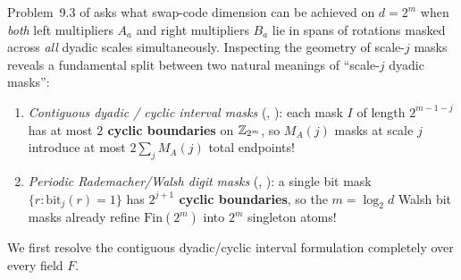 Problem~9.3 of \cite{SeventeenthPaper2026} asks what swap-code dimension can be achieved on
$d = 2^m$ when \emph{both} left multipliers $A_a$ and right multipliers $B_a$ lie in spans of
rotations masked across \emph{all} dyadic scales simultaneously. Inspecting the geometry of
scale-$j$ masks reveals a fundamental split between two natural meanings of ``scale-$j$ dyadic
masks'':
\begin{enumerate}[label=(\roman*)]
\item \emph{Contiguous dyadic / cyclic interval masks} (,
  ): each mask $I$ of length $2^{m-1-j}$ has at most \textbf{$2$ cyclic
  boundaries} on $\mathbb{Z}_{2^m}$, so $M_A(j)$ masks at scale $j$ introduce at most $2\sum_j M_A(j)$
  total endpoints!
\item \emph{Periodic Rademacher/Walsh digit masks} (,
  ): a single bit mask $\{r : \text{bit}_j(r) = 1\}$ has
  \textbf{$2^{j+1}$ cyclic boundaries}, so the $m = \log_2 d$ Walsh bit masks already refine
  $\mathrm{Fin}(2^m)$ into $2^m$ singleton atoms!
\end{enumerate}

We first resolve the contiguous dyadic/cyclic interval formulation completely over every field $F$.

